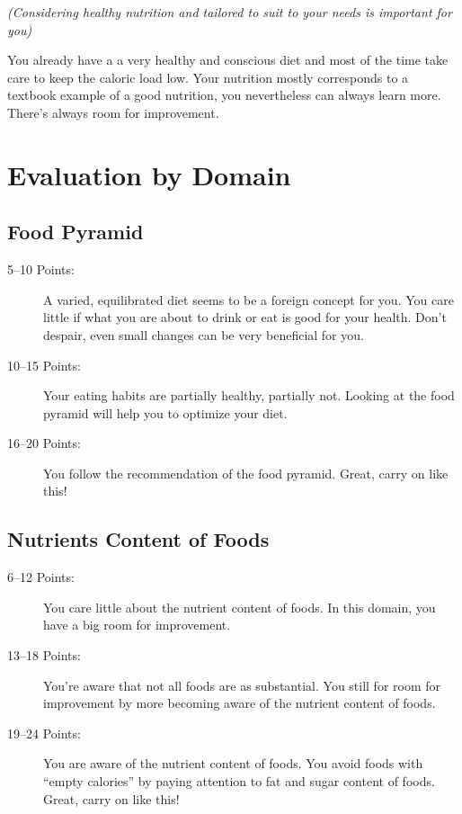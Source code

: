 \documentclass[../main.tex]{subfiles}
\begin{document}
\noindent  \emph{(Considering healthy nutrition and tailored to suit to your needs is important for you)}

\vspace{2mm}

You already have a a very healthy and conscious diet and most of the time take care to keep the caloric load low.
Your nutrition mostly corresponds to a textbook example of a good nutrition, you nevertheless can always learn more.
There's always room for improvement.

\newpage

\section{Evaluation by Domain}

\subsection{Food Pyramid}

\begin{description}
\item[5--10 Points:] A varied, equilibrated diet seems to be a foreign concept for you.
  You care little if what you are about to drink or eat is good for your health.
  Don't despair, even small changes can be very beneficial for you.
\item[10--15 Points:] Your eating habits are partially healthy, partially not.
  Looking at the food pyramid will help you to optimize your diet.
\item[16--20 Points:] You follow the recommendation of the food pyramid.
  Great, carry on like this!
\end{description}


\subsection{Nutrients Content of Foods}

\begin{description}
\item[6--12 Points:]  You care little about the nutrient content of foods. 
  In this domain, you have a big room for improvement.
\item[13--18 Points:] You're aware that not all foods are as substantial.
  You still for room for improvement by more becoming aware of the nutrient content of foods.
\item[19--24 Points:] You are aware of the nutrient content of foods.
  You avoid foods with ``empty calories'' by paying attention to fat and sugar content of foods.
  Great, carry on like this!
\end{description}
\end{document}
